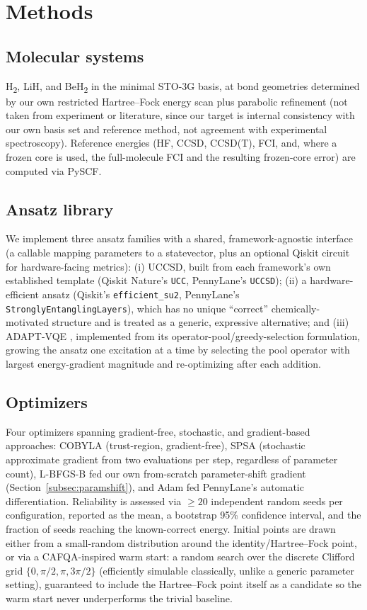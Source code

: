 \documentclass[11pt]{article}
\begin{document}
\section{Methods}
\label{sec:methods}

\subsection{Molecular systems}
H\textsubscript{2}, LiH, and BeH\textsubscript{2} in the minimal STO-3G basis,
at bond geometries determined by our own restricted Hartree--Fock energy scan
plus parabolic refinement (not taken from experiment or literature, since our
target is internal consistency with our own basis set and reference method,
not agreement with experimental spectroscopy). Reference energies (HF, CCSD,
CCSD(T), FCI, and, where a frozen core is used, the full-molecule FCI and the
resulting frozen-core error) are computed via PySCF.

\subsection{Ansatz library}
We implement three ansatz families with a shared, framework-agnostic
interface (a callable mapping parameters to a statevector, plus an optional
Qiskit circuit for hardware-facing metrics): (i) UCCSD, built from each
framework's own established template (Qiskit Nature's \texttt{UCC}, PennyLane's
\texttt{UCCSD}); (ii) a hardware-efficient ansatz (Qiskit's
\texttt{efficient\_su2}, PennyLane's \texttt{StronglyEntanglingLayers}), which
has no unique ``correct'' chemically-motivated structure and is treated as a
generic, expressive alternative; and (iii) ADAPT-VQE
\cite{grimsley2019adapt}, implemented from its operator-pool/greedy-selection
formulation, growing the ansatz one excitation at a time by selecting the pool
operator with largest energy-gradient magnitude and re-optimizing after each
addition.

\subsection{Optimizers}
Four optimizers spanning gradient-free, stochastic, and gradient-based
approaches: COBYLA (trust-region, gradient-free), SPSA (stochastic
approximate gradient from two evaluations per step, regardless of parameter
count), L-BFGS-B fed our own from-scratch parameter-shift gradient
(Section~\ref{subsec:paramshift}), and Adam fed PennyLane's automatic
differentiation. Reliability is assessed via $\geq\!20$ independent random
seeds per configuration, reported as the mean, a bootstrap 95\% confidence
interval, and the fraction of seeds reaching the known-correct energy. Initial
points are drawn either from a small-random distribution around the
identity/Hartree--Fock point, or via a CAFQA-inspired \cite{ravi2023cafqa}
warm start: a random search over the discrete Clifford grid
$\{0,\pi/2,\pi,3\pi/2\}$ (efficiently simulable classically, unlike a generic
parameter setting), guaranteed to include the Hartree--Fock point itself as a
candidate so the warm start never underperforms the trivial baseline.
\end{document}
